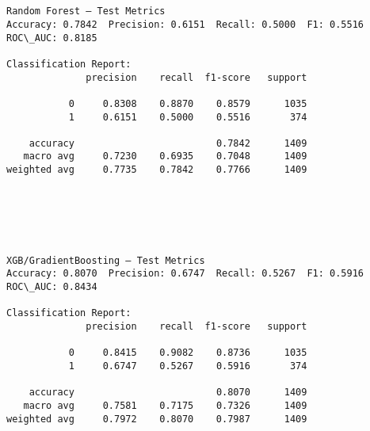 \documentclass[11pt]{article}
\begin{document}
    \begin{center}
    \end{center}
    { \hspace*{\fill} \\}
    
    \begin{Verbatim}[commandchars=\\\{\}]

Random Forest — Test Metrics
Accuracy: 0.7842  Precision: 0.6151  Recall: 0.5000  F1: 0.5516  ROC\_AUC: 0.8185

Classification Report:
              precision    recall  f1-score   support

           0     0.8308    0.8870    0.8579      1035
           1     0.6151    0.5000    0.5516       374

    accuracy                         0.7842      1409
   macro avg     0.7230    0.6935    0.7048      1409
weighted avg     0.7735    0.7842    0.7766      1409

    \end{Verbatim}

    \begin{center}
    \end{center}
    { \hspace*{\fill} \\}
    
    \begin{center}
    \end{center}
    { \hspace*{\fill} \\}
    
    \begin{Verbatim}[commandchars=\\\{\}]

XGB/GradientBoosting — Test Metrics
Accuracy: 0.8070  Precision: 0.6747  Recall: 0.5267  F1: 0.5916  ROC\_AUC: 0.8434

Classification Report:
              precision    recall  f1-score   support

           0     0.8415    0.9082    0.8736      1035
           1     0.6747    0.5267    0.5916       374

    accuracy                         0.8070      1409
   macro avg     0.7581    0.7175    0.7326      1409
weighted avg     0.7972    0.8070    0.7987      1409

    \end{Verbatim}
\end{document}

